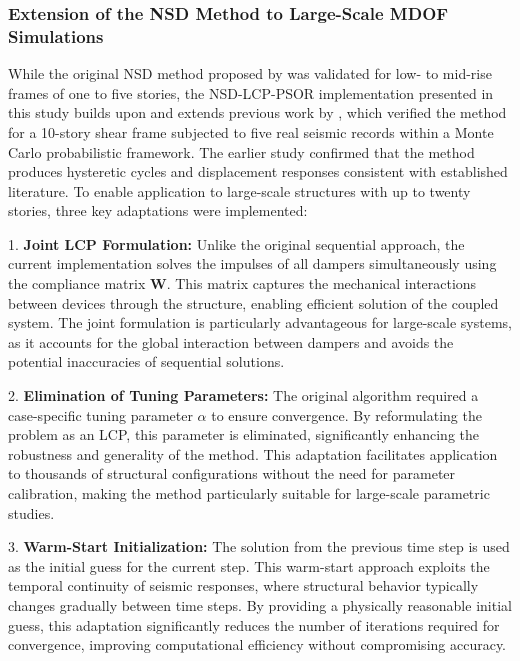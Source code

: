 \documentclass[preprint,12pt,authoryear]{elsarticle}
\begin{document}
\subsubsection{Extension of the NSD Method to Large-Scale MDOF Simulations}
\label{sec:theory:extension}

While the original NSD method proposed by \citet{Namorado2022} was validated for low- to mid-rise frames of one to five stories, the NSD-LCP-PSOR implementation presented in this study builds upon and extends previous work by \citet{Ponce2026}, which verified the method for a 10-story shear frame subjected to five real seismic records within a Monte Carlo probabilistic framework. The earlier study confirmed that the method produces hysteretic cycles and displacement responses consistent with established literature. To enable application to large-scale structures with up to twenty stories, three key adaptations were implemented:

1. \textbf{Joint LCP Formulation:} Unlike the original sequential approach, the current implementation solves the impulses of all dampers simultaneously using the compliance matrix $\bm{W}$. This matrix captures the mechanical interactions between devices through the structure, enabling efficient solution of the coupled system. The joint formulation is particularly advantageous for large-scale systems, as it accounts for the global interaction between dampers and avoids the potential inaccuracies of sequential solutions.

2. \textbf{Elimination of Tuning Parameters:} The original algorithm required a case-specific tuning parameter $\alpha$ to ensure convergence. By reformulating the problem as an LCP, this parameter is eliminated, significantly enhancing the robustness and generality of the method. This adaptation facilitates application to thousands of structural configurations without the need for parameter calibration, making the method particularly suitable for large-scale parametric studies.

3. \textbf{Warm-Start Initialization:} The solution from the previous time step is used as the initial guess for the current step. This warm-start approach exploits the temporal continuity of seismic responses, where structural behavior typically changes gradually between time steps. By providing a physically reasonable initial guess, this adaptation significantly reduces the number of iterations required for convergence, improving computational efficiency without compromising accuracy.
\end{document}
